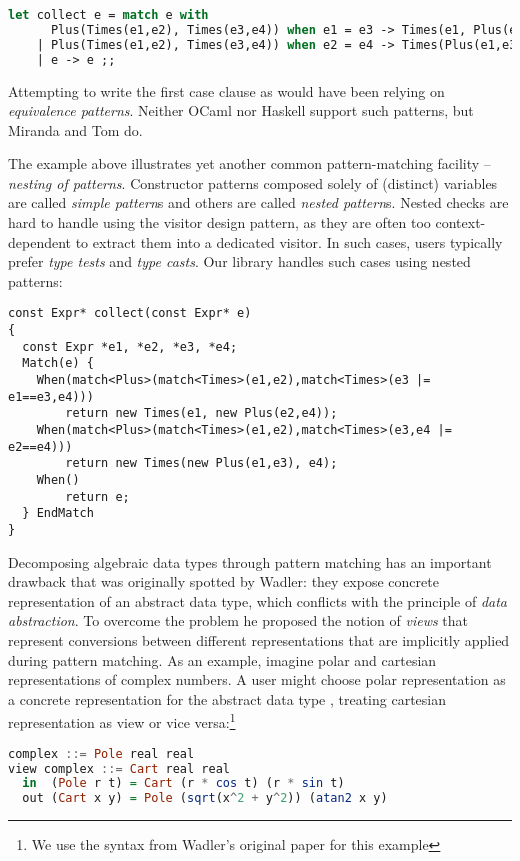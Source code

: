 \begin{lstlisting}[language=Caml,keepspaces,columns=flexible]
let collect e = match e with
      Plus(Times(e1,e2), Times(e3,e4)) when e1 = e3 -> Times(e1, Plus(e2,e4))
    | Plus(Times(e1,e2), Times(e3,e4)) when e2 = e4 -> Times(Plus(e1,e3), e4)
    | e -> e ;;
\end{lstlisting}

\noindent
Attempting to write the first case clause as  would have been relying on \emph{equivalence patterns}. 
Neither OCaml nor Haskell support such patterns, but
Miranda\cite{Miranda85} and Tom\cite{Moreau:2003} do.

The example above illustrates yet another common pattern-matching facility -- 
\emph{nesting of patterns}. Constructor patterns composed 
solely of (distinct) variables are called \emph{simple pattern}s
and others are called \emph{nested pattern}s.
Nested checks are hard to handle using the visitor design pattern, as they are often 
too context-dependent to extract them into a dedicated visitor. 
In such cases, users typically prefer \emph{type tests} and \emph{type 
casts}. Our library handles such cases using nested patterns:
\begin{lstlisting}
const Expr* collect(const Expr* e)
{
  const Expr *e1, *e2, *e3, *e4;
  Match(e) {
    When(match<Plus>(match<Times>(e1,e2),match<Times>(e3 |= e1==e3,e4))) 
        return new Times(e1, new Plus(e2,e4));
    When(match<Plus>(match<Times>(e1,e2),match<Times>(e3,e4 |= e2==e4))) 
        return new Times(new Plus(e1,e3), e4);
    When() 
        return e;
  } EndMatch
}
\end{lstlisting}

\noindent
Decomposing algebraic data types through pattern matching has an important 
drawback that was originally spotted by Wadler\cite{Wadler87}: they expose 
concrete representation of an abstract data type, which conflicts with the 
principle of \emph{data abstraction}. To overcome the problem he proposed the 
notion of \emph{views} that represent conversions between different 
representations that are implicitly applied during pattern matching. As an 
example, imagine polar and cartesian representations of complex numbers. A user 
might choose polar representation as a concrete representation for the abstract 
data type , treating cartesian representation as view or vice 
versa:\footnote{We use the syntax from Wadler's original paper for this example}

\begin{lstlisting}[language=Haskell,columns=flexible]
complex ::= Pole real real
view complex ::= Cart real real
  in  (Pole r t) = Cart (r * cos t) (r * sin t)
  out (Cart x y) = Pole (sqrt(x^2 + y^2)) (atan2 x y)
\end{lstlisting}

